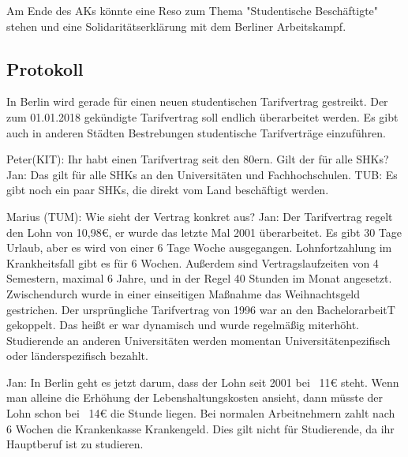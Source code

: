     Am Ende des AKs könnte eine Reso zum Thema "Studentische Beschäftigte" stehen und eine Solidaritätserklärung mit dem Berliner Arbeitskampf.

  \subsection*{Protokoll}
  In Berlin wird gerade für einen neuen studentischen Tarifvertrag gestreikt. Der zum 01.01.2018 gekündigte Tarifvertrag soll endlich überarbeitet werden. Es gibt auch in anderen Städten Bestrebungen studentische Tarifverträge einzuführen.

    \begin{outline}
      \1 Peter(KIT): Ihr habt einen Tarifvertrag seit den 80ern. Gilt der für alle SHKs?
          \2 Jan: Das gilt für alle SHKs an den Universitäten und Fachhochschulen.
          \2 TUB: Es gibt noch ein paar SHKs, die direkt vom Land beschäftigt werden.

      \1 Marius (TUM): Wie sieht der Vertrag konkret aus?
          \2 Jan: Der Tarifvertrag regelt den Lohn von 10,98€, er wurde das letzte Mal 2001 überarbeitet. Es gibt 30 Tage Urlaub, aber es wird von einer 6 Tage Woche ausgegangen. Lohnfortzahlung im Krankheitsfall gibt es für 6 Wochen. Außerdem sind Vertragslaufzeiten von 4 Semestern, maximal 6 Jahre, und in der Regel 40 Stunden im Monat angesetzt. Zwischendurch wurde in einer einseitigen Maßnahme das Weihnachtsgeld gestrichen. Der ursprüngliche Tarifvertrag von 1996 war an den BachelorarbeitT gekoppelt. Das heißt er war dynamisch und wurde regelmäßig miterhöht. Studierende an anderen Universitäten werden momentan Universitätenpezifisch oder länderspezifisch bezahlt.

      \1 Jan: In Berlin geht es jetzt darum, dass der Lohn seit 2001 bei ~11€ steht. Wenn man alleine die Erhöhung der Lebenshaltungskosten ansieht, dann müsste der Lohn schon bei ~14€ die Stunde liegen. Bei normalen Arbeitnehmern zahlt nach 6 Wochen die Krankenkasse Krankengeld. Dies gilt nicht für Studierende, da ihr Hauptberuf ist zu studieren.


\end{outline}
